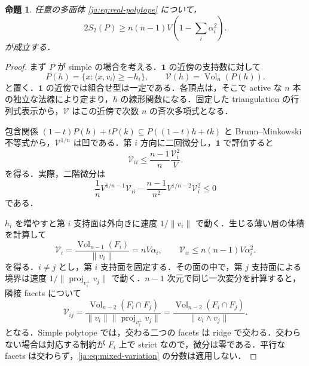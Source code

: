 \documentclass[12pt]{amsart}
\theoremstyle{definition}
\theoremstyle{remark}
\numberwithin{equation}{section}
\theoremstyle{plain}
\newtheorem{jprop}[thm]{命題}
\theoremstyle{definition}
\theoremstyle{remark}
\begin{document}
\begin{jprop}\label{ja:prop:ridge}
任意の多面体 \eqref{ja:eq:real-polytope} について，
\begin{equation}\label{ja:eq:ridge-bound}
 2S_2(P)\ge n(n-1)V\left(1-\sum_i\alpha_i^2\right).
\end{equation}
が成立する．
\end{jprop}
\begin{proof}
まず $P$ が simple の場合を考える．$\mathbf1$ の近傍の支持数に対して
\begin{equation}\label{ja:eq:support}
 P(h)=\{x:\langle x,v_i\rangle\ge-h_i\},\qquad
 \mathcal V(h)=\operatorname{Vol}_n(P(h)).
\end{equation}
と置く．$\mathbf1$ の近傍では組合せ型は一定である．各頂点は，そこで active な $n$ 本の独立な法線により定まり，$h$ の線形関数になる．固定した triangulation の行列式表示から，$\mathcal V$ はこの近傍で次数 $n$ の斉次多項式となる．

包含関係 $(1-t)P(h)+tP(k)\subseteq P((1-t)h+tk)$ と Brunn--Minkowski 不等式から，$\mathcal V^{1/n}$ は凹である．第 $i$ 方向に二回微分し，$\mathbf1$ で評価すると
\begin{equation}\label{ja:eq:hessian-diagonal}
 \mathcal V_{ii}\le\frac{n-1}{n}\frac{\mathcal V_i^2}{V}.
\end{equation}
を得る．実際，二階微分は
\[
\frac1nV^{1/n-1}\mathcal V_{ii}
-\frac{n-1}{n^2}V^{1/n-2}\mathcal V_i^2\le0
\]
である．

$h_i$ を増やすと第 $i$ 支持面は外向きに速度 $1/\|v_i\|$ で動く．生じる薄い層の体積を計算して
\begin{equation}\label{ja:eq:first-variation}
 \mathcal V_i=\frac{\operatorname{Vol}_{n-1}(F_i)}{\|v_i\|}
 =nV\alpha_i,\qquad
 \mathcal V_{ii}\le n(n-1)V\alpha_i^2.
\end{equation}
を得る．$i\ne j$ とし，第 $i$ 支持面を固定する．その面の中で，第 $j$ 支持面による境界は速度 $1/\|\operatorname{proj}_{v_i^\perp}v_j\|$ で動く．$n-1$ 次元で同じ一次変分を計算すると，隣接 facets について
\begin{equation}\label{ja:eq:mixed-variation}
 \mathcal V_{ij}
 =\frac{\operatorname{Vol}_{n-2}(F_i\cap F_j)}
 {\|v_i\|\|\operatorname{proj}_{v_i^\perp}v_j\|}
 =\frac{\operatorname{Vol}_{n-2}(F_i\cap F_j)}
 {\|v_i\wedge v_j\|}.
\end{equation}
となる．Simple polytope では，交わる二つの facets は ridge で交わる．交わらない場合は対応する制約が $F_i$ 上で strict なので，微分は零である．平行な facets は交わらず，\eqref{ja:eq:mixed-variation} の分数は適用しない．


\end{proof}
\end{document}
